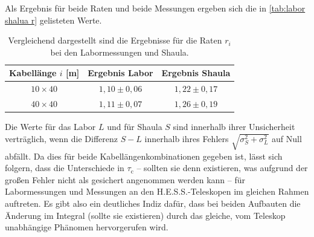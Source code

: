 Als Ergebnis für beide Raten und beide Messungen ergeben sich die in \autoref{tab:labor shalua r} gelisteten Werte. 
\begin{table}[h]
    \centering
    \begin{tabular}{|c|c|c|}\hline
        Kabellänge $i$ [m]       & Ergebnis Labor      & Ergebnis Shaula     \\\hline
        $10\times 40$            & $1{,}10 \pm 0{,}06$ & $1{,}22 \pm 0{,}17$ \\\hline
        $40\times 40$            & $1{,}11 \pm 0{,}07$ & $1{,}26 \pm 0{,}19$ \\\hline
    \end{tabular}
    \caption{Vergleichend dargestellt sind die Ergebnisse für die Raten $r_i$ bei den Labormessungen und Shaula.}
    \label{tab:labor shalua r}
\end{table}
Die Werte für das Labor $L$ und für Shaula $S$ sind innerhalb ihrer Unsicherheit verträglich, wenn die Differenz $S-L$ innerhalb ihres Fehlers $\sqrt{\sigma_S^2 + \sigma_L^2}$ auf Null abfällt. 
Da dies für beide Kabellängenkombinationen gegeben ist, lässt sich folgern, dass die Unterschiede in $\tau_{\mathrm{c}}$ -- sollten sie denn existieren, was aufgrund der großen Fehler nicht als gesichert angenommen werden kann -- für Labormessungen und Messungen an den H.E.S.S.-Teleskopen im  gleichen Rahmen auftreten. 
Es gibt also ein deutliches Indiz dafür, dass bei beiden Aufbauten die Änderung im Integral (sollte sie existieren) durch das gleiche, vom Teleskop unabhängige Phänomen hervorgerufen wird. \\

